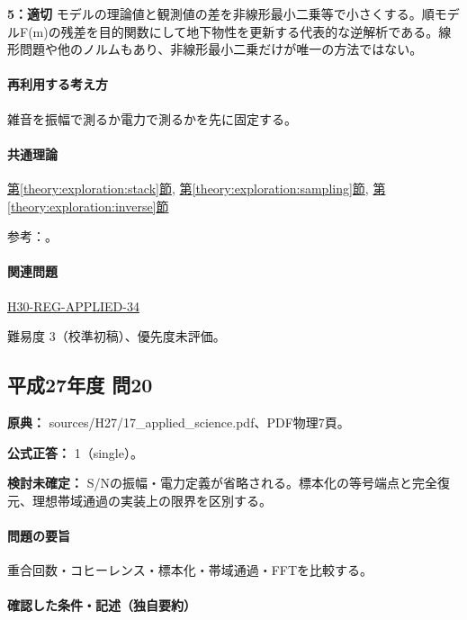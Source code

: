 \noindent\textbf{5：適切} モデルの理論値と観測値の差を非線形最小二乗等で小さくする。順モデルF(m)の残差を目的関数にして地下物性を更新する代表的な逆解析である。線形問題や他のノルムもあり、非線形最小二乗だけが唯一の方法ではない。\par

\paragraph{再利用する考え方} 雑音を振幅で測るか電力で測るかを先に固定する。

\paragraph{共通理論} \hyperref[theory:exploration:stack]{第\ref*{theory:exploration:stack}節}, \hyperref[theory:exploration:sampling]{第\ref*{theory:exploration:sampling}節}, \hyperref[theory:exploration:inverse]{第\ref*{theory:exploration:inverse}節}

\par 参考：\cite{mit_signals2010,mit_moving2012,scipy_notch,scipy_fft,usgs_processing2000,pygimli_inversion}。

\paragraph{関連問題} \hyperref[q:h30-reg-applied-34]{H30-REG-APPLIED-34}

\par 難易度 3（校準初稿）、優先度未評価。

\subsection{平成27年度 問20}
\label{q:h27-reg-applied-20}

\noindent\textbf{原典：} sources/H27/17\_applied\_science.pdf、PDF物理7頁。

\textbf{公式正答：} 1（single）。

\par\textbf{検討未確定：} S/Nの振幅・電力定義が省略される。標本化の等号端点と完全復元、理想帯域通過の実装上の限界を区別する。

\paragraph{問題の要旨} 重合回数・コヒーレンス・標本化・帯域通過・FFTを比較する。

\paragraph{確認した条件・記述（独自要約）}\mbox{}\par

